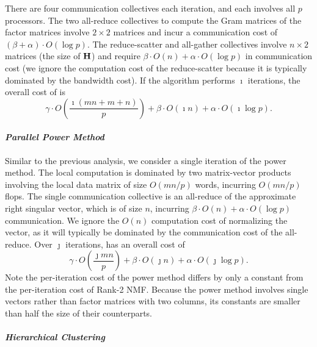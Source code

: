 \documentclass[conference,compsoc]{IEEEtran}
\begin{document}
There are four communication collectives each iteration, and each involves all $p$ processors.
The two all-reduce collectives to compute the Gram matrices of the factor matrices involve $2\times 2$ matrices and incur a communication cost of $(\beta + \alpha) \cdot O(\log p)$.
The reduce-scatter and all-gather collectives involve $n\times 2$ matrices (the size of $\M{H}$) and require $\beta \cdot O(n) + \alpha \cdot O(\log p)$ in communication cost (we ignore the computation cost of the reduce-scatter because it is typically dominated by the bandwidth cost).
If the algorithm performs $\imath$ iterations, the overall cost of  is
\begin{equation}
\label{eq:r2nmfcost}
\gamma \cdot O\left( \frac{\imath (mn+m+n)}{p} \right) + \beta \cdot O(\imath n) + \alpha \cdot O(\imath \log p).
\end{equation}

\paragraph{\emph{Parallel Power Method}}

Similar to the previous analysis, we consider a single iteration of the power method.
The local computation is dominated by two matrix-vector products involving the local data matrix of size $O(mn/p)$ words, incurring $O(mn/p)$ flops.
The single communication collective is an all-reduce of the approximate right singular vector, which is of size $n$, incurring $\beta \cdot O(n) + \alpha \cdot O(\log p)$ communication.
We ignore the $O(n)$ computation cost of normalizing the vector, as it will typically be dominated by the communication cost of the all-reduce.
Over $\jmath$ iterations,  has an overall cost of
\begin{equation}
\label{eq:powmethcost}
\gamma \cdot O\left( \frac{\jmath mn}{p} \right) + \beta \cdot O(\jmath n) + \alpha \cdot O(\jmath \log p).
\end{equation}
Note the per-iteration cost of the power method differs by only a constant from the per-iteration cost of Rank-2 NMF.
Because the power method involves single vectors rather than factor matrices with two columns, its constants are smaller than half the size of their counterparts.

\paragraph{\emph{Hierarchical Clustering}}
\end{document}
